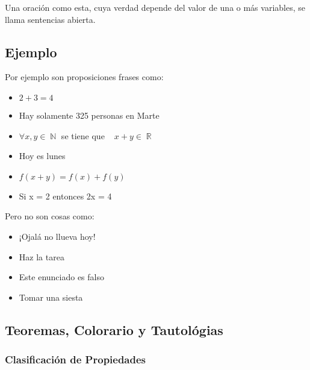 \documentclass[12pt]{report}                                    %
\DeclareMathOperator \Space {\quad}                             %
\DeclareMathOperator \MiniSpace {\;}                            %
\DeclareMathOperator \Naturals {\mathbb{N}}                     %
\DeclareMathOperator \Reals {\mathbb{R}}                        %
\begin{document}
            Una oración como esta, cuya verdad depende del valor de una o más variables,
            se llama sentencias abierta.





            \clearpage
            \subsection*{Ejemplo}


                Por ejemplo son proposiciones frases como:
                \begin{itemize}
                    \item $2 + 3 = 4$
                    \item Hay solamente 325 personas en Marte
                    \item $\forall x, y \in \Naturals$ se tiene que $\MiniSpace x+y \in \Reals$
                    \item Hoy es lunes
                    \item $f(x+y) = f(x) + f(y)$
                    \item Si x = 2 entonces 2x = 4
                \end{itemize}

                Pero no son cosas como:
                \begin{itemize}
                    \item ¡Ojalá no llueva hoy!
                    \item Haz la tarea
                    \item Este enunciado es falso
                    \item Tomar una siesta
                \end{itemize}



        \clearpage
        \subsection{Teoremas, Colorario y Tautológias}
            
            \subsubsection*{Clasificación de Propiedades}
\end{document}
